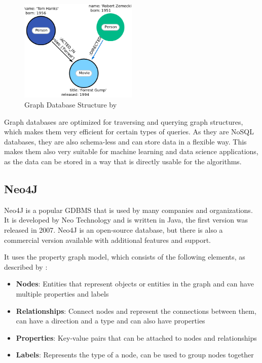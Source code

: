 \documentclass[english,smartquotes,apa]{hgbreport}
\begin{document}
\begin{figure}[h]
	\centering
	\includegraphics[width=0.5\textwidth]{graphdb.png}
	\caption{Graph Database Structure by \cite{neo4j}}
	\label{fig:graph}
\end{figure}

Graph databases are optimized for traversing and querying graph structures, which makes them very efficient for certain types of queries. As they are NoSQL databases, they are also schema-less and can store data in a flexible way. This makes them also very suitable for machine learning and data science applications, as the data can be stored in a way that is directly usable for the algorithms.

\subsection*{Neo4J}

Neo4J is a popular GDBMS that is used by many companies and organizations. It is developed by Neo Technology and is written in Java, the first version was released in 2007. Neo4J is an open-source database, but there is also a commercial version available with additional features and support. \parencite{neo4j}

It uses the property graph model, which consists of the following elements, as described by \cite{lal2015neo4j}:

\begin{itemize}
	\item \textbf{Nodes}: Entities that represent objects or entities in the graph and can have multiple properties and labels
	\item \textbf{Relationships}: Connect nodes and represent the connections between them, can have a direction and a type and can also have properties
	\item \textbf{Properties}: Key-value pairs that can be attached to nodes and relationships
	\item \textbf{Labels}: Represents the type of a node, can be used to group nodes together
\end{itemize}
\end{document}
